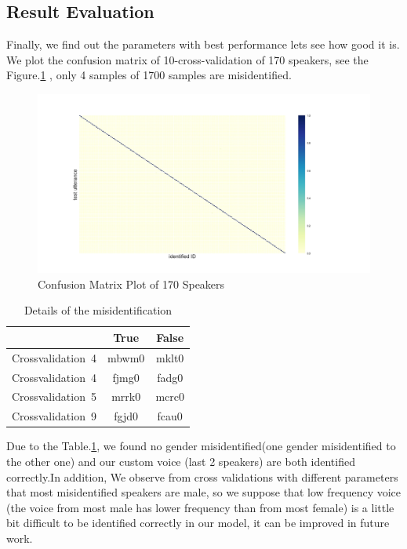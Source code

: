 \documentclass[12pt,DIV14,BCOR12mm,a4paper,footinclude=false,headinclude,parskip=half-,twoside,openright,cleardoublepage=empty,toc=index,bibliography=totoc,listof=totoc]{scrreprt}
\numberwithin{equation}{chapter}
\begin{document}
\subsection{Result Evaluation}
Finally, we find out the parameters with best performance lets see how good it is. We plot the confusion matrix of 10-cross-validation of 170 speakers, see the Figure.\ref{con_mat} , only 4 samples of 1700 samples are misidentified. 

\begin{figure}
	\centering
	\includegraphics[scale=0.3]{image/confusion_matrix}
	\caption{Confusion Matrix Plot of 170 Speakers}
	\label{con_mat}
\end{figure}

\begin{table}
	\centering
	\caption{Details of the misidentification}
	\label{misid}
	\begin{tabular}{lcc}
		\toprule
		& True & False  \\
		\midrule
		Crossvalidation\ 4 & mbwm0 & mklt0 \\
		Crossvalidation\ 4 & fjmg0 & fadg0 \\
		Crossvalidation\ 5 & mrrk0 & mcrc0 \\
		Crossvalidation\ 9 & fgjd0 & fcau0 \\
		\bottomrule
	\end{tabular}
\end{table}

Due to the Table.\ref{misid}, we found no gender misidentified(one gender misidentified to the other one) and our custom voice (last 2 speakers) are both identified correctly.In addition, We observe from cross validations with different parameters that most misidentified speakers are male, so we suppose that low frequency voice (the voice from most male has lower frequency than from most female) is a little bit difficult to be identified correctly in our model, it can be improved in future work.
\end{document}
